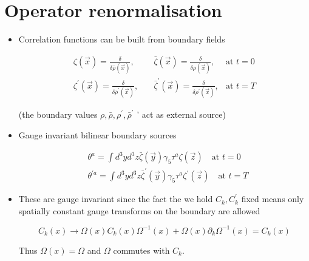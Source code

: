 \section{Operator renormalisation}

\begin{itemize}
  \item Correlation functions can be built from boundary fields

\begin{equation}
\begin{array}{lll}
\zeta(\vec{x})=\frac{\delta}{\delta \bar{\rho}{(\vec x)}},\quad & \bar{\zeta}(\vec{x})=\frac{\delta}{\delta \rho(\vec{x})}, & \text{at } t=0\\
\zeta^{\prime}(\vec{x})=\frac{\delta}{\delta \bar{\rho}^{\prime}(\vec{x})},\quad & \bar{\zeta}^{\prime}(\vec{x})=\frac{\delta}{\delta \rho^{\prime}(\vec{x})},  & \text{at } t=T
\end{array}     
\end{equation}


(the boundary values \(\rho, \bar{\rho}, \rho^{\prime}, \bar{\rho}^\prime\) ' act as external source)

  \item Gauge invariant bilinear boundary sources

\begin{equation}
\begin{aligned}
& \theta^{a}=\int d^{3} y d^{3} z \bar{\zeta}(\vec{y}) \gamma_{5} \tau^{a} \zeta(\vec{z}) \quad \text{at } t=0 \\
& \theta^{\prime a}=\int d^{3} y d^{3} z \bar{\zeta}^{\prime}(\vec{y}) \gamma_{5} \tau^{a} \zeta^{\prime}(\vec{z}) \quad \text{at } t=T
\end{aligned}
\end{equation}


  \item These are gauge invariant since the fact the we hold \(C_{k}, C_{k}^{\prime}\) fixed means only spatially constant gauge transforms on the boundary are allowed

\begin{equation}
C_{k}(x) \rightarrow \Omega(x) C_{k}(x) \Omega^{-1}(x)+\Omega(x) \partial_{k} \Omega^{-1}(x)=C_{k}(x)
\end{equation}

Thus \(\Omega(x)=\Omega\) and \(\Omega\) commutes with \(C_{k}\).


\end{itemize}
